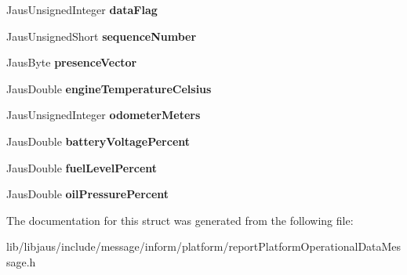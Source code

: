 \begin{DoxyCompactItemize}
\item 
\hypertarget{struct_report_platform_operational_data_message_struct_a1955b797b877c0f6756d0bd8c3fe5f5a}{\-Jaus\-Unsigned\-Integer {\bfseries data\-Flag}}\label{struct_report_platform_operational_data_message_struct_a1955b797b877c0f6756d0bd8c3fe5f5a}

\item 
\hypertarget{struct_report_platform_operational_data_message_struct_a76b8aeb32fd78ed234e9dd0f3d34a502}{\-Jaus\-Unsigned\-Short {\bfseries sequence\-Number}}\label{struct_report_platform_operational_data_message_struct_a76b8aeb32fd78ed234e9dd0f3d34a502}

\item 
\hypertarget{struct_report_platform_operational_data_message_struct_aceb6ef0a7af5999ffcd11072fe4c12c6}{\-Jaus\-Byte {\bfseries presence\-Vector}}\label{struct_report_platform_operational_data_message_struct_aceb6ef0a7af5999ffcd11072fe4c12c6}

\item 
\hypertarget{struct_report_platform_operational_data_message_struct_aa4bcd862120b5fd336b2b72a3a3fd962}{\-Jaus\-Double {\bfseries engine\-Temperature\-Celsius}}\label{struct_report_platform_operational_data_message_struct_aa4bcd862120b5fd336b2b72a3a3fd962}

\item 
\hypertarget{struct_report_platform_operational_data_message_struct_acff1b3ed4e7fe6619f6bd4b77e53c589}{\-Jaus\-Unsigned\-Integer {\bfseries odometer\-Meters}}\label{struct_report_platform_operational_data_message_struct_acff1b3ed4e7fe6619f6bd4b77e53c589}

\item 
\hypertarget{struct_report_platform_operational_data_message_struct_add158b0b048754d524ffdbb868de2ac1}{\-Jaus\-Double {\bfseries battery\-Voltage\-Percent}}\label{struct_report_platform_operational_data_message_struct_add158b0b048754d524ffdbb868de2ac1}

\item 
\hypertarget{struct_report_platform_operational_data_message_struct_a47afa257301c0793697500903f6a2890}{\-Jaus\-Double {\bfseries fuel\-Level\-Percent}}\label{struct_report_platform_operational_data_message_struct_a47afa257301c0793697500903f6a2890}

\item 
\hypertarget{struct_report_platform_operational_data_message_struct_ad7c3a181f4cd19af9d7b7d55a265f1b4}{\-Jaus\-Double {\bfseries oil\-Pressure\-Percent}}\label{struct_report_platform_operational_data_message_struct_ad7c3a181f4cd19af9d7b7d55a265f1b4}

\end{DoxyCompactItemize}


\-The documentation for this struct was generated from the following file\-:\begin{DoxyCompactItemize}
\item 
lib/libjaus/include/message/inform/platform/report\-Platform\-Operational\-Data\-Message.\-h\end{DoxyCompactItemize}
